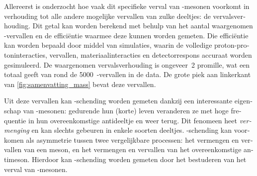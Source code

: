 \begin{otherlanguage}{dutch}
Allereerst is onderzocht hoe vaak dit specifieke verval van \Bs-mesonen voorkomt in verhouding tot alle andere mogelijke vervallen van zulke deeltjes: de vervalsverhouding.
Dit getal kan worden berekend met behulp van het aantal waargenomen \BsDsK-vervallen en de effici\"entie waarmee deze kunnen worden gemeten.
Die effici\"entie kan worden bepaald door middel van simulaties, waarin de volledige proton-protoninteracties, vervallen, materiaalinteracties en detectorrespons accuraat worden gesimuleerd.
De waargenomen vervalsverhouding is ongeveer~\num{2} promille, wat een totaal geeft van rond de \num{5000}~\BsDsK-vervallen in de data.
De grote piek aan linkerkant van \cref{fig:samenvatting_mass} bevat deze vervallen.

Uit deze vervallen kan \CP-schending worden gemeten dankzij een interessante eigenschap van \Bs-mesonen: gedurende hun (korte) leven veranderen ze met hoge frequentie in hun overeenkomstige antideeltje en weer terug.
Dit fenomeen heet \emph{vermenging} en kan slechts gebeuren in enkele soorten deeltjes.
\CP-schending kan voorkomen als asymmetrie tussen twee vergelijkbare processen: het vermengen en vervallen van een meson, en het vermengen en vervallen van het overeenkomstige antimeson.
Hierdoor kan \CP-schending worden gemeten door het bestuderen van het verval van \Bs-mesonen.


\end{otherlanguage}
